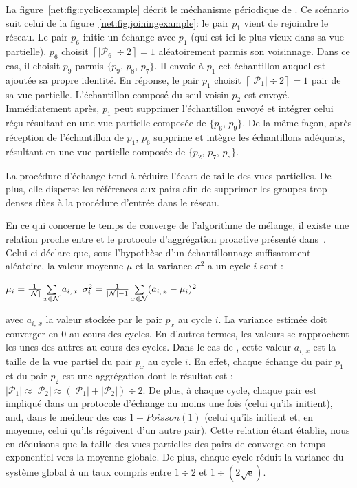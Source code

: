 La figure~\ref{net:fig:cyclicexample} décrit le méchanisme périodique de \SPRAY. Ce
scénario suit celui de la figure~\ref{net:fig:joiningexample}: le pair $p_1$ vient
de rejoindre le réseau. Le pair $p_6$ initie un échange avec $p_1$ (qui est ici
le plus vieux dans sa vue partielle). $p_6$ choisit
$\left\lceil{|\mathcal{P}_6|\div 2}\right\rceil = 1$ aléatoirement parmis son
voisinnage. Dans ce cas, il choisit $p_9$ parmis $\{p_9,\,p_8,\,p_7\}$. Il
envoie à $p_1$ cet échantillon auquel est ajoutée sa propre identité. En
réponse, le pair $p_1$ choisit
$\left\lceil{|\mathcal{P}_1|\div 2}\right\rceil = 1$ pair de sa vue
partielle. L'échantillon composé du seul voisin $p_2$ est envoyé. Immédiatement
après, $p_1$ peut supprimer l'échantillon envoyé et intégrer celui réçu
résultant en une vue partielle composée de $\{p_6,\, p_9\}$. De la même façon,
après réception de l'échantillon de $p_1$, $p_6$ supprime et intègre les
échantillons adéquats, résultant en une vue partielle composée de
$\{p_2,\,p_7,\,p_8\}$.

La procédure d'échange tend à réduire l'écart de taille des vues partielles. De
plus, elle disperse les références aux pairs afin de supprimer les groupes trop
denses dûes à la procédure d'entrée dans le réseau.

En ce qui concerne le temps de converge de l'algorithme de mélange, il existe
une relation proche entre \SPRAY et le protocole d'aggrégation proactive
présenté dans~\cite{jelasity2004epidemic, montresor2004robust}. Celui-ci déclare
que, sous l'hypothèse d'un échantillonnage suffisamment aléatoire, la valeur
moyenne $\mu$ et la variance $\sigma^2$ a un cycle $i$ sont :
\begin{center}
  $\mu_i = {1\over{|\mathcal{N}|}} \sum\limits_{x \in \mathcal{N}} a_{i,\,x}$
  \hfill
  $\sigma^2_i = {1\over{|\mathcal{N}|-1}}\sum\limits_{x \in \mathcal{N}}
  (a_{i,\,x} - \mu_i)^2$
\end{center}
avec $a_{i,\,x}$ la valeur stockée par le pair $p_x$ au cycle $i$. La variance
estimée doit converger en 0 au cours des cycles. En d'autres termes, les valeurs
se rapprochent les unes des autres au cours des cycles. Dans le cas de \SPRAY,
cette valeur $a_{i,\,x}$ est la taille de la vue partiel du pair $p_x$ au cycle
$i$. En effet, chaque échange du pair $p_1$ et du pair $p_2$ est une aggrégation
dont le résultat est :
$|\mathcal{P}_1|\approx|\mathcal{P}_2|\approx{(|\mathcal{P}_1| +
  |\mathcal{P}_2|) \div 2}$.
De plus, à chaque cycle, chaque pair est impliqué dans un protocole d'échange au
moins une fois (celui qu'ils initient), and, dans le meilleur des cas
$1+Poisson(1)$ (celui qu'ils initient et, en moyenne, celui qu'ils réçoivent
d'un autre pair). Cette relation étant établie, nous en déduisons que la taille
des vues partielles des pairs de \SPRAY converge en temps exponentiel vers la
moyenne globale. De plus, chaque cycle réduit la variance du système global à un
taux compris entre ${1\div 2}$ et $1\div ({2\sqrt{\text{e}}})$.

